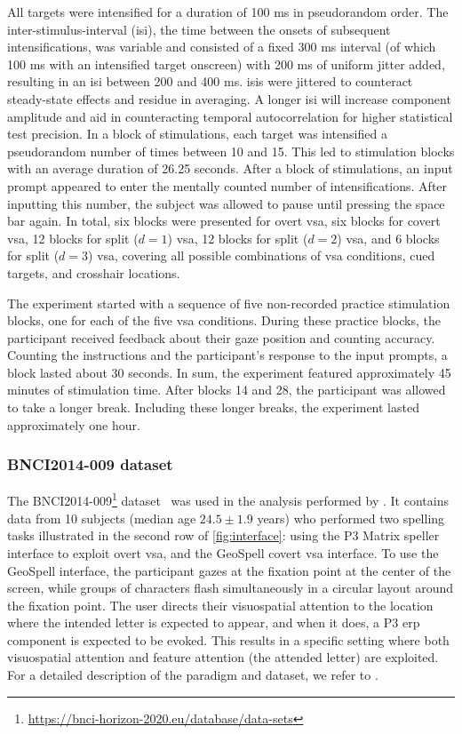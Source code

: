 All targets were intensified for a duration of 100 ms in pseudorandom order.
The inter-stimulus-interval (\ac{isi}), the time between the onsets of subsequent intensifications,
was variable and consisted of a fixed 300 ms interval (of which 100 ms with an intensified target onscreen)
with 200 ms of uniform jitter added, resulting in an \ac{isi}
between 200 and 400 ms.
\Acp{isi} were jittered to counteract steady-state effects and residue in averaging. A
longer \ac{isi} will increase component amplitude and aid in counteracting temporal
autocorrelation for higher statistical test precision.
In a block of stimulations, each target was intensified a pseudorandom number of times between 10 and 15.
This led to stimulation blocks with an average duration of 26.25 seconds. After a block of stimulations, an
input prompt appeared to enter the mentally counted number of intensifications.
After inputting this number, the subject was allowed to pause until pressing the space bar again.
In total, six blocks were presented for overt \ac{vsa}, six blocks for covert \ac{vsa}, 12 blocks for
split ($d=1$) \ac{vsa}, 12 blocks for split ($d=2$) \ac{vsa}, and 6 blocks for split
($d=3$) \ac{vsa}, covering all possible combinations of \ac{vsa} conditions, cued targets, and
crosshair locations.

The experiment started with a sequence  of five non-recorded practice stimulation blocks, one for
each of the five \ac{vsa} conditions.
During these practice blocks, the participant received feedback about their gaze
position and counting accuracy.
Counting the instructions and the participant's response to the
input prompts, a block lasted about 30 seconds. In sum, the experiment featured approximately 45 minutes of
stimulation time.
After blocks 14 and 28, the participant was allowed to take a longer break.
Including these longer breaks, the experiment lasted approximately one hour.

\subsubsection{BNCI2014-009 dataset}
The BNCI2014-009\footnote{\url{https://bnci-horizon-2020.eu/database/data-sets}}
dataset~\cite{Aloise2012a} was used in the analysis performed
by \textcite{Arico2014}.
It contains data from 10 subjects (median age $24.5\pm1.9$
years) who performed two spelling tasks illustrated in the second row of
\cref{fig:interface}: using the P3 Matrix speller
interface to exploit overt \ac{vsa}, and the GeoSpell covert \ac{vsa} interface.
To use the GeoSpell interface, the participant gazes at the fixation point at the
center of the screen, while groups of characters flash simultaneously in a
circular layout around the fixation point.
The user directs their visuospatial attention to the location where the intended letter is expected
to appear, and when it does, a P3 \ac{erp} component is expected to be evoked.
This results in a specific setting where both visuospatial attention and
feature attention (the attended letter) are exploited.
For a detailed description of the paradigm and dataset, we refer
to \textcite{Aloise2012a}.

